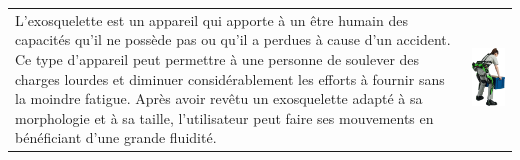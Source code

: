 \begin{multicols}{2}
\ifprof
\else
\noindent
\begin{tabular}{m{.6\linewidth}m{.3\linewidth}}
L’exosquelette est un appareil qui apporte à un être humain des capacités qu’il ne possède pas ou qu’il a perdues à cause d’un accident. Ce type d’appareil peut permettre à une personne de soulever des charges lourdes et diminuer considérablement les efforts à fournir sans la moindre fatigue. Après avoir revêtu un exosquelette adapté à sa morphologie et à sa taille, l’utilisateur peut faire ses mouvements en bénéficiant
d’une grande fluidité.
& 
\includegraphics[width=\linewidth]{images/fig_02}


\end{tabular}
\end{multicols}
